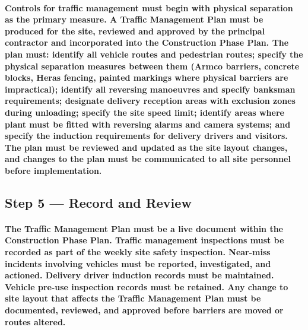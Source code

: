 \paragraph{Controls for traffic management must begin with physical separation as the primary measure. A Traffic Management Plan must be produced for the site, reviewed and approved by the principal contractor and incorporated into the Construction Phase Plan. The plan must: identify all vehicle routes and pedestrian routes; specify the physical separation measures between them (Armco barriers, concrete blocks, Heras fencing, painted markings where physical barriers are impractical); identify all reversing manoeuvres and specify banksman requirements; designate delivery reception areas with exclusion zones during unloading; specify the site speed limit; identify areas where plant must be fitted with reversing alarms and camera systems; and specify the induction requirements for delivery drivers and visitors. The plan must be reviewed and updated as the site layout changes, and changes to the plan must be communicated to all site personnel before implementation.}

\subsection{Step 5 --- Record and Review}
\paragraph{The Traffic Management Plan must be a live document within the Construction Phase Plan. Traffic management inspections must be recorded as part of the weekly site safety inspection. Near-miss incidents involving vehicles must be reported, investigated, and actioned. Delivery driver induction records must be maintained. Vehicle pre-use inspection records must be retained. Any change to site layout that affects the Traffic Management Plan must be documented, reviewed, and approved before barriers are moved or routes altered.}

